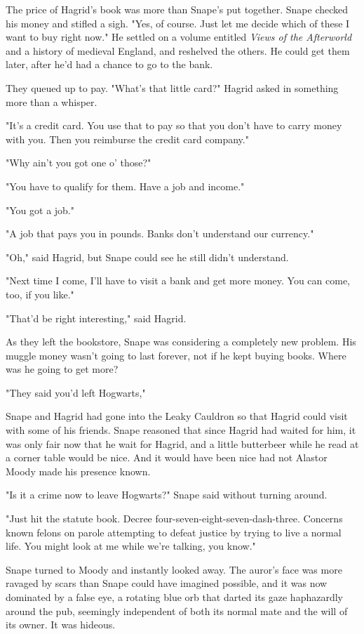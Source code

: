The price of Hagrid's book was more than Snape's put together. Snape checked his money and stifled a sigh. "Yes, of course. Just let me decide which of these I want to buy right now." He settled on a volume entitled \emph{Views of the Afterworld} and a history of medieval England, and reshelved the others. He could get them later, after he'd had a chance to go to the bank.

They queued up to pay. "What's that little card?" Hagrid asked in something more than a whisper.

"It's a credit card. You use that to pay so that you don't have to carry money with you. Then you reimburse the credit card company."

"Why ain't you got one o' those?"

"You have to qualify for them. Have a job and income."

"You got a job."

"A job that pays you in pounds. Banks don't understand our currency."

"Oh," said Hagrid, but Snape could see he still didn't understand.

"Next time I come, I'll have to visit a bank and get more money. You can come, too, if you like."

"That'd be right interesting," said Hagrid.

As they left the bookstore, Snape was considering a completely new problem. His muggle money wasn't going to last forever, not if he kept buying books. Where was he going to get more?

"They said you'd left Hogwarts,"

Snape and Hagrid had gone into the Leaky Cauldron so that Hagrid could visit with some of his friends. Snape reasoned that since Hagrid had waited for him, it was only fair now that he wait for Hagrid, and a little butterbeer while he read at a corner table would be nice. And it would have been nice had not Alastor Moody made his presence known.

"Is it a crime now to leave Hogwarts?" Snape said without turning around.

"Just hit the statute book. Decree four-seven-eight-seven-dash-three. Concerns known felons on parole attempting to defeat justice by trying to live a normal life. You might look at me while we're talking, you know."

Snape turned to Moody and instantly looked away. The auror's face was more ravaged by scars than Snape could have imagined possible, and it was now dominated by a false eye, a rotating blue orb that darted its gaze haphazardly around the pub, seemingly independent of both its normal mate and the will of its owner. It was hideous.

